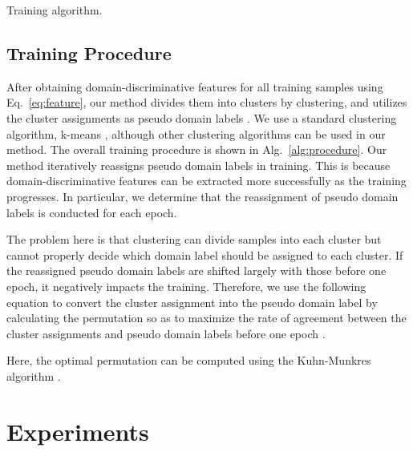 \documentclass[letterpaper]{article} \usepackage{aaai20}  \usepackage{times}  \usepackage{helvet} \usepackage{courier}  \usepackage[hyphens]{url}  \usepackage{graphicx} \urlstyle{rm} \def\UrlFont{\rm}  \usepackage{graphicx}  \usepackage[whole]{bxcjkjatype}
\begin{document}
\begin{algorithm}[t]
\caption{Training algorithm.}
\label{alg:procedure}
\begin{algorithmic}
\ENDWHILE
{}
\ENDWHILE
\end{algorithmic}
\end{algorithm}

\subsection{Training Procedure}
After obtaining domain-discriminative features for all training samples using Eq.~\ref{eq:feature}, our method divides them into  clusters by clustering, and utilizes the cluster assignments  as pseudo domain labels . We use a standard clustering algorithm, k-means \cite{Kmeans}, although other clustering algorithms can be used in our method. The overall training procedure is shown in Alg.~\ref{alg:procedure}. Our method iteratively reassigns pseudo domain labels in training.
This is because domain-discriminative features can be extracted more successfully as the training progresses.
In particular, we determine that the reassignment of pseudo domain labels is conducted for each epoch.\par
The problem here is that clustering can divide samples into each cluster but cannot properly decide which domain label should be assigned to each cluster.
If the reassigned pseudo domain labels are shifted largely with those before one epoch, it negatively impacts the training. Therefore, we use the following equation to convert the cluster assignment  into the pseudo domain label  by calculating the permutation  so as to maximize the rate of agreement between the cluster assignments  and pseudo domain labels before one epoch .

Here, the optimal permutation  can be computed using the Kuhn-Munkres algorithm \cite{Kuhn_Munkres}.

\section{Experiments}
\end{document}

